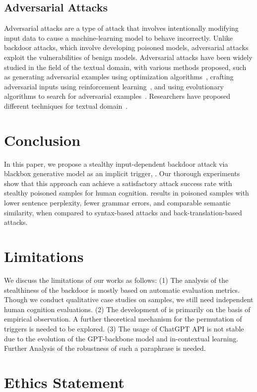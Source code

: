 \subsection{Adversarial Attacks}
Adversarial attacks are a type of attack that involves intentionally modifying input data to cause a machine-learning model to behave incorrectly. Unlike backdoor attacks, which involve developing poisoned models, adversarial attacks exploit the vulnerabilities of benign models. Adversarial attacks have been widely studied in the field of the textual domain, with various methods proposed, such as generating adversarial examples using optimization algorithms~\cite{goodfellow2014explaining}, crafting adversarial inputs using reinforcement learning~\cite{papernot2016transferability}, and using evolutionary algorithms to search for adversarial examples~\cite{9022866}. Researchers have proposed different techniques for textual domain~\cite{zhang-etal-2022-sharp, xie-etal-2022-word, gan-etal-2022-triggerless}.

\section{Conclusion}\label{sec:conclusion}
In this paper, we propose a stealthy input-dependent backdoor attack via blackbox generative model as an implicit trigger, \method. Our thorough experiments show that this approach can achieve a satisfactory attack success rate with stealthy poisoned samples for human cognition. \method results in poisoned samples with lower sentence perplexity, fewer grammar errors, and comparable semantic similarity, when compared to syntax-based attacks and back-translation-based attacks. 
\section*{Limitations}
We discuss the limitations of our works as follows: (1) The analysis of the stealthiness of the backdoor is mostly based on automatic evaluation metrics. Though we conduct qualitative case studies on samples, we still need independent human cognition evaluations. (2) The development of \method is primarily on the basis of empirical observation. A further theoretical mechanism for the permutation of triggers is needed to be explored. (3) The usage of ChatGPT API is not stable due to the evolution of the GPT-backbone model and in-contextual learning. Further Analysis of the robustness of such a paraphrase is needed. \section*{Ethics Statement}
